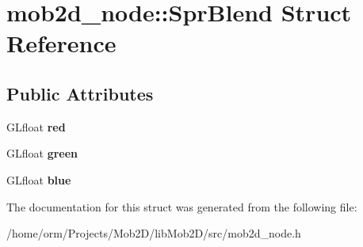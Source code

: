\hypertarget{structmob2d__node_1_1SprBlend}{
\section{mob2d\_\-node::SprBlend Struct Reference}
\label{structmob2d__node_1_1SprBlend}
}
\subsection*{Public Attributes}
\begin{DoxyCompactItemize}
\item 
\hypertarget{structmob2d__node_1_1SprBlend_af9c9c0b4a08fdebda912774beba768c1}{
GLfloat {\bfseries red}}
\label{structmob2d__node_1_1SprBlend_af9c9c0b4a08fdebda912774beba768c1}

\item 
\hypertarget{structmob2d__node_1_1SprBlend_a088f8e542574dc2ddf5f2b0c629e6b76}{
GLfloat {\bfseries green}}
\label{structmob2d__node_1_1SprBlend_a088f8e542574dc2ddf5f2b0c629e6b76}

\item 
\hypertarget{structmob2d__node_1_1SprBlend_a8a2a50d64e9fe0ac1ffed0f5bdd9d6ff}{
GLfloat {\bfseries blue}}
\label{structmob2d__node_1_1SprBlend_a8a2a50d64e9fe0ac1ffed0f5bdd9d6ff}

\end{DoxyCompactItemize}


The documentation for this struct was generated from the following file:\begin{DoxyCompactItemize}
\item 
/home/orm/Projects/Mob2D/libMob2D/src/mob2d\_\-node.h\end{DoxyCompactItemize}
